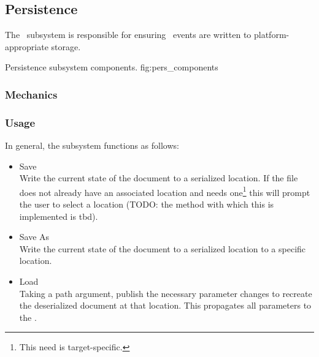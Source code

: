 \subsection{Persistence}
The \permod\ subsystem is responsible for ensuring \docdtype\ events are written to platform-appropriate storage.

{Persistence subsystem components.}
{fig:pers_components}

\subsubsection{Mechanics}

\subsubsection{Usage}
In general, the subsystem functions as follows:
\begin{itemize}
      \item Save \\
            Write the current state of the document to a serialized location.
            If the file does not already have an associated location and needs one\footnote{This need is target-specific.} this will prompt the user to select a location (TODO: the method with which this is implemented is tbd).
      \item Save As \\
            Write the current state of the document to a serialized location to a specific location.
      \item Load \\
            Taking a path argument, publish the necessary parameter changes to recreate the deserialized document at that location.
            This propagates all parameters to the \docftype.
\end{itemize}

